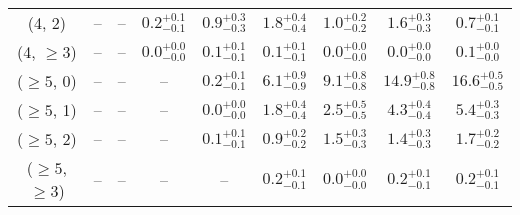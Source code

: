 \begin{table}[h!]
{\begin{tabular}{ccccccccc}
	(4, 2) & -- & -- & $0.2^{+ 0.1 }_{- 0.1 }$ & $0.9^{+ 0.3 }_{- 0.3 }$ & $1.8^{+ 0.4 }_{- 0.4 }$ & $1.0^{+ 0.2 }_{- 0.2 }$ & $1.6^{+ 0.3 }_{- 0.3 }$ & $0.7^{+ 0.1 }_{- 0.1 }$ \\[0.5ex] 
	(4, $\ge3$) & -- & -- & $0.0^{+ 0.0 }_{- 0.0 }$ & $0.1^{+ 0.1 }_{- 0.1 }$ & $0.1^{+ 0.1 }_{- 0.1 }$ & $0.0^{+ 0.0 }_{- 0.0 }$ & $0.0^{+ 0.0 }_{- 0.0 }$ & $0.1^{+ 0.0 }_{- 0.0 }$ \\[0.5ex] 
	($\ge5$, 0) & -- & -- & -- & $0.2^{+ 0.1 }_{- 0.1 }$ & $6.1^{+ 0.9 }_{- 0.9 }$ & $9.1^{+ 0.8 }_{- 0.8 }$ & $14.9^{+ 0.8 }_{- 0.8 }$ & $16.6^{+ 0.5 }_{- 0.5 }$ \\[0.5ex] 
	($\ge5$, 1) & -- & -- & -- & $0.0^{+ 0.0 }_{- 0.0 }$ & $1.8^{+ 0.4 }_{- 0.4 }$ & $2.5^{+ 0.5 }_{- 0.5 }$ & $4.3^{+ 0.4 }_{- 0.4 }$ & $5.4^{+ 0.3 }_{- 0.3 }$ \\[0.5ex] 
	($\ge5$, 2) & -- & -- & -- & $0.1^{+ 0.1 }_{- 0.1 }$ & $0.9^{+ 0.2 }_{- 0.2 }$ & $1.5^{+ 0.3 }_{- 0.3 }$ & $1.4^{+ 0.3 }_{- 0.3 }$ & $1.7^{+ 0.2 }_{- 0.2 }$ \\[0.5ex] 
	($\ge5$, $\ge3$) & -- & -- & -- & -- & $0.2^{+ 0.1 }_{- 0.1 }$ & $0.0^{+ 0.0 }_{- 0.0 }$ & $0.2^{+ 0.1 }_{- 0.1 }$ & $0.2^{+ 0.1 }_{- 0.1 }$ \\[0.5ex] 
	\hline
	\hline
\end{tabular}}
\end{table}
